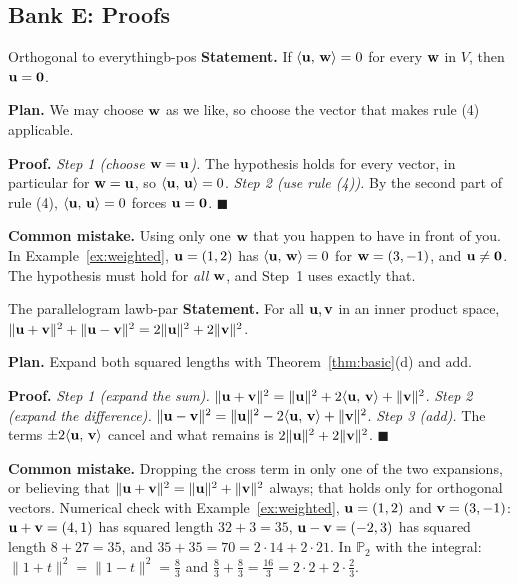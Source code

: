\documentclass[11pt]{article}
\begin{document}
\subsection*{Bank E: Proofs}
\begin{exmp}{Orthogonal to everything}{b-pos}
\textbf{Statement.} If $\langle \mathbf{u},\,\mathbf{w}\rangle=0$ for every $\mathbf{w}$ in $V$, then $\mathbf{u}=\mathbf{0}$.

\textbf{Plan.} We may choose $\mathbf{w}$ as we like, so choose the vector that makes rule (4) applicable.

\textbf{Proof.}
\emph{Step 1 (choose $\mathbf{w}=\mathbf{u}$).} The hypothesis holds for every vector, in particular for $\mathbf{w}=\mathbf{u}$, so $\langle \mathbf{u},\,\mathbf{u}\rangle=0$.
\emph{Step 2 (use rule (4)).} By the second part of rule (4), $\langle \mathbf{u},\,\mathbf{u}\rangle=0$ forces $\mathbf{u}=\mathbf{0}$. \qquad$\blacksquare$

\textbf{Common mistake.} Using only one $\mathbf{w}$ that you happen to have in front of you. In Example~\ref{ex:weighted}, $\mathbf{u}=(1,2)$ has $\langle \mathbf{u},\,\mathbf{w}\rangle=0$ for $\mathbf{w}=(3,-1)$, and $\mathbf{u}\neq\mathbf{0}$. The hypothesis must hold for \emph{all} $\mathbf{w}$, and Step~1 uses exactly that.
\end{exmp}

\begin{exmp}{The parallelogram law}{b-par}
\textbf{Statement.} For all $\mathbf{u},\mathbf{v}$ in an inner product space, $\lVert\mathbf{u}+\mathbf{v}\rVert^2+\lVert\mathbf{u}-\mathbf{v}\rVert^2=2\lVert\mathbf{u}\rVert^2+2\lVert\mathbf{v}\rVert^2$.

\textbf{Plan.} Expand both squared lengths with Theorem~\ref{thm:basic}(d) and add.

\textbf{Proof.}
\emph{Step 1 (expand the sum).} $\lVert\mathbf{u}+\mathbf{v}\rVert^2=\lVert\mathbf{u}\rVert^2+2\langle \mathbf{u},\,\mathbf{v}\rangle+\lVert\mathbf{v}\rVert^2$.
\emph{Step 2 (expand the difference).} $\lVert\mathbf{u}-\mathbf{v}\rVert^2=\lVert\mathbf{u}\rVert^2-2\langle \mathbf{u},\,\mathbf{v}\rangle+\lVert\mathbf{v}\rVert^2$.
\emph{Step 3 (add).} The terms $\pm2\langle \mathbf{u},\,\mathbf{v}\rangle$ cancel and what remains is $2\lVert\mathbf{u}\rVert^2+2\lVert\mathbf{v}\rVert^2$. \qquad$\blacksquare$

\textbf{Common mistake.} Dropping the cross term in only one of the two expansions, or believing that $\lVert\mathbf{u}+\mathbf{v}\rVert^2=\lVert\mathbf{u}\rVert^2+\lVert\mathbf{v}\rVert^2$ always; that holds only for orthogonal vectors. Numerical check with Example~\ref{ex:weighted}, $\mathbf{u}=(1,2)$ and $\mathbf{v}=(3,-1)$: $\mathbf{u}+\mathbf{v}=(4,1)$ has squared length $32+3=35$, $\mathbf{u}-\mathbf{v}=(-2,3)$ has squared length $8+27=35$, and $35+35=70=2\cdot14+2\cdot21$. In $\mathbb{P}_2$ with the integral: $\lVert1+t\rVert^2=\lVert1-t\rVert^2=\tfrac83$ and $\tfrac83+\tfrac83=\tfrac{16}3=2\cdot2+2\cdot\tfrac23$.
\end{exmp}
\end{document}
